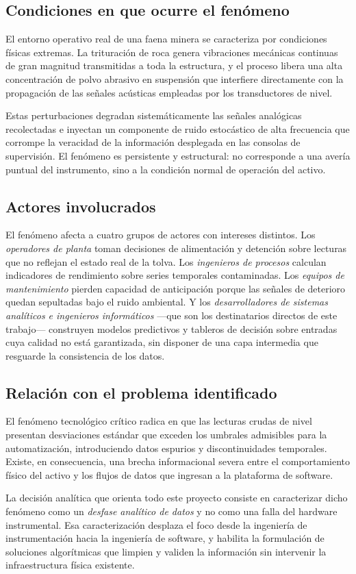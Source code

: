 \subsection{Condiciones en que ocurre el fenómeno}

El entorno operativo real de una faena minera se caracteriza por condiciones
físicas extremas. La trituración de roca genera vibraciones mecánicas continuas
de gran magnitud transmitidas a toda la estructura, y el proceso libera una alta
concentración de polvo abrasivo en suspensión que interfiere directamente con la
propagación de las señales acústicas empleadas por los transductores de nivel.

Estas perturbaciones degradan sistemáticamente las señales analógicas
recolectadas e inyectan un componente de ruido estocástico de alta frecuencia
que corrompe la veracidad de la información desplegada en las consolas de
supervisión. El fenómeno es persistente y estructural: no corresponde a una
avería puntual del instrumento, sino a la condición normal de operación del
activo.

\subsection{Actores involucrados}

El fenómeno afecta a cuatro grupos de actores con intereses distintos. Los
\emph{operadores de planta} toman decisiones de alimentación y detención sobre
lecturas que no reflejan el estado real de la tolva. Los \emph{ingenieros de
procesos} calculan indicadores de rendimiento sobre series temporales
contaminadas. Los \emph{equipos de mantenimiento} pierden capacidad de
anticipación porque las señales de deterioro quedan sepultadas bajo el ruido
ambiental. Y los \emph{desarrolladores de sistemas analíticos e ingenieros
informáticos} —que son los destinatarios directos de este trabajo— construyen
modelos predictivos y tableros de decisión sobre entradas cuya calidad no está
garantizada, sin disponer de una capa intermedia que resguarde la consistencia
de los datos.

\subsection{Relación con el problema identificado}

El fenómeno tecnológico crítico radica en que las lecturas crudas de nivel
presentan desviaciones estándar que exceden los umbrales admisibles para la
automatización, introduciendo datos espurios y discontinuidades temporales.
Existe, en consecuencia, una brecha informacional severa entre el comportamiento
físico del activo y los flujos de datos que ingresan a la plataforma de
software.

La decisión analítica que orienta todo este proyecto consiste en caracterizar
dicho fenómeno como un \emph{desfase analítico de datos} y no como una falla del
hardware instrumental. Esa caracterización desplaza el foco desde la ingeniería
de instrumentación hacia la ingeniería de software, y habilita la formulación de
soluciones algorítmicas que limpien y validen la información sin intervenir la
infraestructura física existente.
